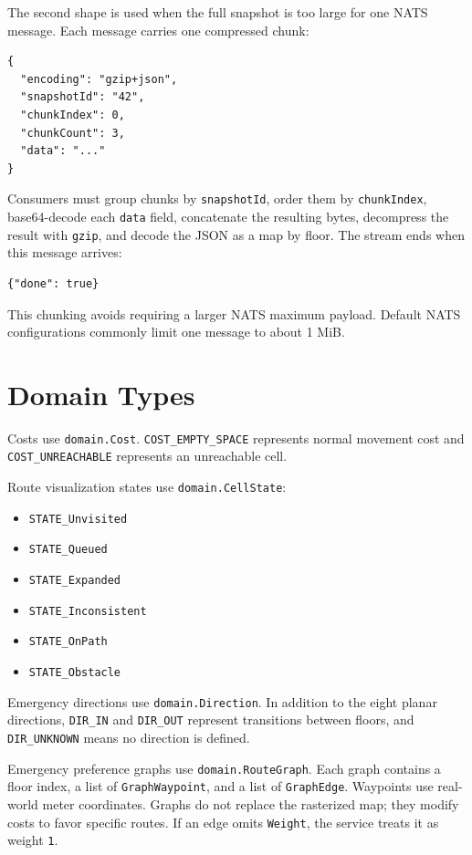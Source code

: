 \documentclass[12pt,a4paper]{report}
\begin{document}
The second shape is used when the full snapshot is too large for one NATS
message. Each message carries one compressed chunk:

\begin{lstlisting}
{
  "encoding": "gzip+json",
  "snapshotId": "42",
  "chunkIndex": 0,
  "chunkCount": 3,
  "data": "..."
}
\end{lstlisting}

Consumers must group chunks by \texttt{snapshotId}, order them by
\texttt{chunkIndex}, base64-decode each \texttt{data} field, concatenate the
resulting bytes, decompress the result with \texttt{gzip}, and decode the JSON as
a map by floor. The stream ends when this message arrives:

\begin{lstlisting}
{"done": true}
\end{lstlisting}

This chunking avoids requiring a larger NATS maximum payload. Default NATS
configurations commonly limit one message to about 1 MiB.

\section{Domain Types}

Costs use \texttt{domain.Cost}. \texttt{COST\_EMPTY\_SPACE} represents normal
movement cost and \newline \texttt{COST\_UNREACHABLE} represents an unreachable cell.

Route visualization states use \texttt{domain.CellState}:

\begin{itemize}
\item \texttt{STATE\_Unvisited}
\item \texttt{STATE\_Queued}
\item \texttt{STATE\_Expanded}
\item \texttt{STATE\_Inconsistent}
\item \texttt{STATE\_OnPath}
\item \texttt{STATE\_Obstacle}
\end{itemize}

Emergency directions use \texttt{domain.Direction}. In addition to the eight
planar directions, \texttt{DIR\_IN} and \texttt{DIR\_OUT} represent transitions
between floors, and \texttt{DIR\_UNKNOWN} means no direction is defined.

Emergency preference graphs use \texttt{domain.RouteGraph}. Each graph contains
a floor index, a list of \texttt{GraphWaypoint}, and a list of
\texttt{GraphEdge}. Waypoints use real-world meter coordinates. Graphs do not
replace the rasterized map; they modify costs to favor specific routes. If an
edge omits \texttt{Weight}, the service treats it as weight \texttt{1}.
\end{document}
